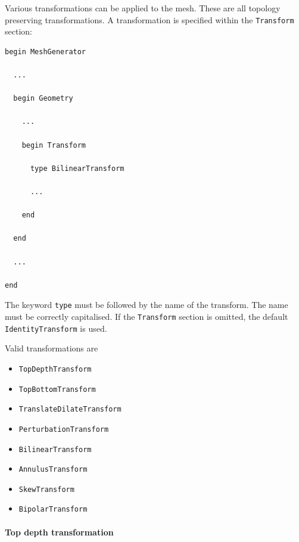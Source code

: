 Various transformations can be applied to the mesh. These are all
topology preserving transformations. A transformation is specified
within the \texttt{Transform} section:
%
\begin{verbatim}
begin MeshGenerator

  ... 

  begin Geometry

    ... 

    begin Transform

      type BilinearTransform

      ... 

    end

  end

  ... 

end
\end{verbatim}
%
The keyword \texttt{type} must be followed by the name of the
transform. The name must be correctly capitalised. If the
\texttt{Transform} section is omitted, the default
\texttt{IdentityTransform} is used. 

Valid transformations are
%
\begin{itemize}
\item \texttt{TopDepthTransform}
\item \texttt{TopBottomTransform}
\item \texttt{TranslateDilateTransform}
\item \texttt{PerturbationTransform}
\item \texttt{BilinearTransform}
\item \texttt{AnnulusTransform}
\item \texttt{SkewTransform}
\item \texttt{BipolarTransform}
\end{itemize}


\paragraph{Top depth transformation}

